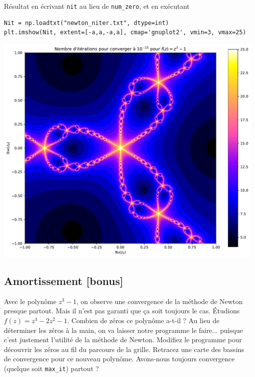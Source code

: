 \documentclass{book}
\newcommand{\inline}[1]{\texttt{#1}}
\begin{document}
\begin{correction}
Résultat en écrivant \inline{nit} au lieu de \inline{num_zero}, et en exécutant
\begin{verbatim}
Nit = np.loadtxt("newton_niter.txt", dtype=int)
plt.imshow(Nit, extent=[-a,a,-a,a], cmap='gnuplot2', vmin=3, vmax=25)
\end{verbatim}
\includegraphics[width=0.95\linewidth]{TD2/newton_newton_niter.a1.pdf}
\end{correction}

\subsection{Amortissement [bonus]}

Avec le polynôme $z^3-1$, on observe une convergence de la méthode de Newton presque partout. Mais il n'est pas garanti que ça soit toujours le cas. Étudions $f(z)=z^4-2z^2-1$. Combien de zéros ce polynôme a-t-il ? Au lieu de déterminer les zéros à la main, on va laisser notre programme le faire... puisque c'est justement l'utilité de la méthode de Newton. Modifiez le programme pour découvrir les zéros au fil du parcours de la grille. Retracez une carte des bassins de convergence pour ce nouveau polynôme. Avons-nous toujours convergence (quelque soit \inline{max_it}) partout ?
\end{document}
